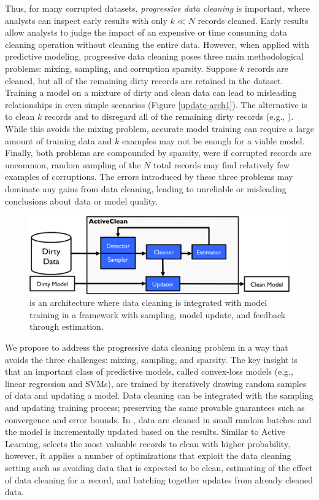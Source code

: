Thus, for many corrupted datasets, \emph{progressive data cleaning} is important, where analysts can inspect early results with only $k \ll N$ records cleaned.
Early results allow analysts to judge the impact of an expensive or time consuming data cleaning operation without cleaning the entire data.
However, when applied with predictive modeling, progressive data cleaning poses three main methodological problems: mixing, sampling, and corruption sparsity.
Suppose $k$ records are cleaned, but all of the remaining dirty records are retained in the dataset.
Training a model on a mixture of dirty and clean data can lead to misleading relationships in even simple scenarios (Figure \ref{update-arch1}).
The alternative is to clean $k$ records and to disregard all of the remaining dirty records (e.g., \cite{wang1999sample}).
While this avoids the mixing problem, accurate model training can require a large amount of training data and $k$ examples may not be enough for a viable model.
Finally, both problems are compounded by sparsity, were if corrupted records are uncommon, random sampling of the $N$ total records may find relatively few examples of corruptions.
The errors introduced by these three problems may dominate any gains from data cleaning, leading to unreliable or misleading conclusions about data or model quality.

\begin{figure}[t]
\centering
 \includegraphics[width=\columnwidth]{figs/arch.png}
 \caption{\sysfull is an architecture where data cleaning is integrated with model training in a framework with sampling, model update, and feedback through estimation. \label{sys-arch}}\vspace{-2em}
\end{figure}

We propose \sys to address the progressive data cleaning problem in a way that avoids the three challenges: mixing, sampling, and sparsity.
The key insight is that an important class of predictive models, called convex-loss models (e.g., linear regression and SVMs), are trained by iteratively drawing random samples of data and updating a model\cite{bertsekas2011incremental}.
Data cleaning can be integrated with the sampling and updating training process; preserving the same provable guarantees such as convergence and error bounds.
In \sys, data are cleaned in small random batches and the model is incrementally updated based on the results.
Similar to Active Learning, \sys selects the most valuable records to clean with higher probability, however, it applies a number of optimizations that exploit the data cleaning setting such as avoiding data that is expected to be clean, estimating of the effect of data cleaning for a record, and batching together updates from already cleaned data.

